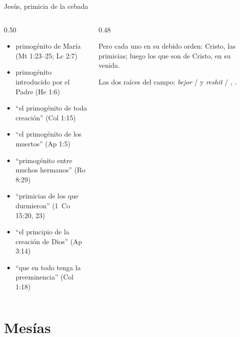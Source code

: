 \begin{frame}{Jesús, primicia de la cebada}
\begin{columns}[c,onlytextwidth]
\begin{column}{0.50\textwidth}\scriptsize\RaggedRight
\begin{itemize}
\item primogénito de María (Mt 1:23--25; Lc 2:7)
\item primogénito introducido por el Padre (He 1:6)
\item ``el primogénito de toda creación'' (Col 1:15)
\item ``el primogénito de los muertos'' (Ap 1:5)
\item ``primogénito entre muchos hermanos'' (Ro 8:29)
\item ``primicias de los que durmieron'' (1~Co 15:20, 23)
\item ``el principio de la creación de Dios'' (Ap 3:14)
\item ``que en todo tenga la preeminencia'' (Col 1:18)
\end{itemize}
\end{column}
\begin{column}{0.48\textwidth}
\begin{cita}Pero cada uno en su debido orden: Cristo, las primicias; luego los que son de Cristo, en su venida.\end{cita}
\scriptsize\RaggedRight Las dos raíces del campo: \emph{bejor} /  y \emph{reshit} / , .\par\smallskip
{}
\end{column}
\end{columns}
\end{frame}

\section{Mesías}

